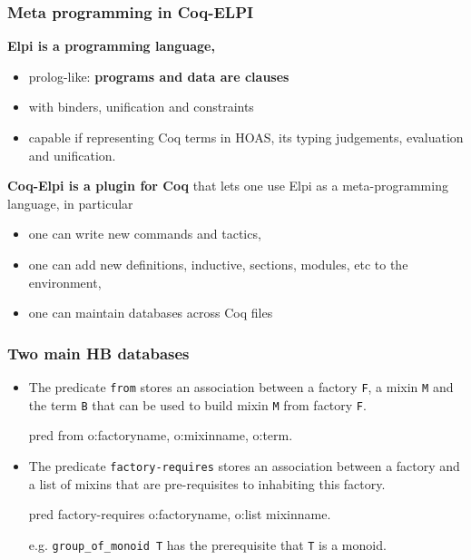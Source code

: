 \documentclass[11pt]{beamer}
\let\L=\lstinline
\begin{document}
\begin{frame}
  \frametitle{Meta programming in {\sc Coq-ELPI}}

  \textbf{{\sc Elpi} is a programming language,}
  \begin{itemize}
  \item prolog-like: \textbf{programs and data are clauses}
  \item with binders, unification and constraints
    \pause
  \item capable if representing {\sc Coq} terms in HOAS, its typing
    judgements, evaluation and unification.
  \end{itemize}
    \pause
    \vfill

  \textbf{{\sc Coq-Elpi} is a plugin for {\sc Coq}} that lets one use {\sc Elpi} as a
    meta-programming language, \pause in particular
  \begin{itemize}
  \item one can write new commands and tactics,
  \item one can add new definitions, inductive, sections, modules, etc
    to the environment,
  \item one can maintain databases across {\sc Coq} files
  \end{itemize}

\end{frame}

\begin{frame}[fragile]
  \frametitle{Two main HB databases}

  \begin{itemize}
  \item The predicate \L{from} stores an association between a factory
    \L{F}, a mixin \L{M} and the term \L{B} that can be used to build
    mixin \L{M} from factory \L{F}.
\begin{elpicode}
pred from o:factoryname, o:mixinname, o:term.
\end{elpicode}
\vfill
  \item The predicate {\footnotesize\tt factory-requires} stores an
    association between a factory and a list of mixins that are
    pre-requisites to inhabiting this factory.
\begin{elpicode}
pred factory-requires o:factoryname, o:list mixinname.
\end{elpicode}
    e.g. \L{group_of_monoid T} has the prerequisite that \L{T} is a
    monoid.
  \end{itemize}

\end{frame}
\end{document}
